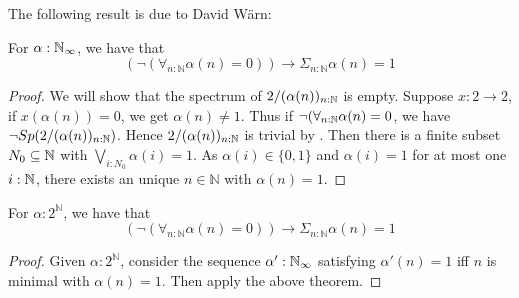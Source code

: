 The following result is due to David W\"arn:
\begin{theorem}\label{MarkovPrinciple}
  For $\alpha:\mathbb{N}_{\infty}$, we have that 
  \begin{equation}
    (\neg (\forall_{n:\mathbb N} \alpha (n)= 0)) \to \Sigma_{n:\mathbb N} \alpha (n)= 1
  \end{equation}
\end{theorem}
\begin{proof}
  We will show that the spectrum of $2/(\alpha(n))_{n:\mathbb{N}}$ is empty. 
  Suppose $x:2\to 2$, if  $x(\alpha(n)) = 0$, we get $\alpha(n) \neq 1$. 
  Thus if $\neg (\forall_{n:\mathbb{N}} \alpha(n) = 0$, we have $\neg Sp(2/(\alpha(n))_{n:\mathbb{N}})$.
  Hence $2/(\alpha(n))_{n:\mathbb{N}}$ is trivial by . 
  Then there is a finite subset $N_0\subseteq \mathbb{N}$ with $\bigvee_{i:N_0} \alpha(i) = 1$. 
  As $\alpha(i) \in \{0,1\}$ and $\alpha(i) = 1$ for at most one $i:\mathbb{N}$, 
  there exists an unique $n\in\mathbb N$ with $\alpha(n) = 1$. 
\end{proof}

\begin{corollary}
  For $\alpha:2^\mathbb N$, we have that 
  \begin{equation}
    (\neg (\forall_{n:\mathbb N} \alpha (n)= 0)) \to \Sigma_{n:\mathbb N} \alpha (n)= 1
  \end{equation}
\end{corollary}
\begin{proof}
  Given $\alpha:2^\mathbb N$, consider the sequence $\alpha':\mathbb{N}_{\infty}$ satisfying $\alpha'(n) = 1$ iff 
  $n$ is minimal with $\alpha(n) = 1$. Then apply the above theorem.
\end{proof}

